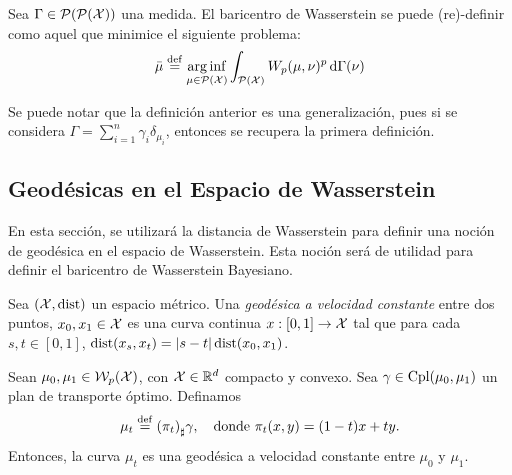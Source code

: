 {{{{				\begin{definition}
					Sea $\Gamma \in \ProbSpace[\ProbSpace]$ una medida. El baricentro de Wasserstein se puede (re)-definir como aquel que minimice el siguiente problema:
					\begin{equation}
						\bar \mu \eqdef \arginf_{\mu \in \ProbSpace} \int_{\ProbSpace} \Wasserstein[p]{\mu}{\nu}^p \dd{\Gamma(\nu)}
					\end{equation}

				\end{definition}

				\begin{remark}
					Se puede notar que la definición anterior es una generalización, pues si se considera $\Gamma = \sum_{i=1}^{n} \gamma_i \delta_{\mu_i}$, entonces se recupera la primera definición.
				\end{remark}



			}  %


			\subsection{Geodésicas en el Espacio de Wasserstein}\label{ssec:geodesicas-Wasserstein}
			{
				En esta sección, se utilizará la distancia de Wasserstein para definir una noción de geodésica en el espacio de Wasserstein. Esta noción será de utilidad para definir el baricentro de Wasserstein Bayesiano.
				\begin{definition}
					Sea $(\cX, \dist)$ un espacio métrico. Una \emph{geodésica a velocidad constante}  entre dos puntos, $x_0, x_1 \in \cX$ es una curva continua $x : [0, 1] \to \cX$  tal que para cada $s, t \in [0, 1]$, $\dist(x_s,x_t) = |s - t| \dist(x_0,x_1) $.
				\end{definition}

				\begin{proposition}
					Sean $\mu_0, \mu_1 \in \WassersteinSpace[p]{\cX} $, con $\cX \in \R^d$  compacto y convexo. Sea $\gamma \in \Cpl(\mu_0, \mu_1)$  un plan de transporte óptimo. Definamos
					\begin{equation}
						\mu_t \eqdef \pf{(\pi_t)} \gamma, \quad \text{donde } \pi_t(x, y) = (1-t)x + ty.
					\end{equation}
					Entonces, la curva $\mu_t$ es una geodésica a velocidad constante entre $\mu_0$ y $\mu_1$.


\end{proposition}}}}}
